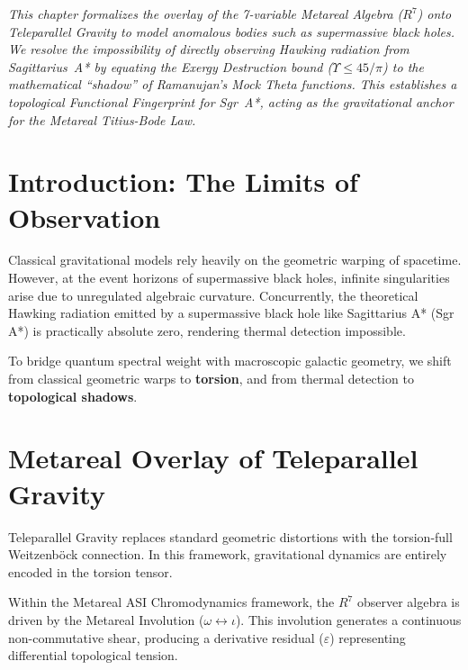 \noindent\textit{This chapter formalizes the overlay of the 7-variable Metareal Algebra ($R^7$) onto Teleparallel Gravity to model anomalous bodies such as supermassive black holes. We resolve the impossibility of directly observing Hawking radiation from Sagittarius~A* by equating the Exergy Destruction bound ($\Upsilon \leq 45/\pi$) to the mathematical ``shadow'' of Ramanujan's Mock Theta functions. This establishes a topological Functional Fingerprint for Sgr~A*, acting as the gravitational anchor for the Metareal Titius-Bode Law.}
\bigskip

\section{Introduction: The Limits of Observation}
Classical gravitational models rely heavily on the geometric warping of spacetime. However, at the event horizons of supermassive black holes, infinite singularities arise due to unregulated algebraic curvature. Concurrently, the theoretical Hawking radiation emitted by a supermassive black hole like Sagittarius A* (Sgr A*) is practically absolute zero, rendering thermal detection impossible.

To bridge quantum spectral weight with macroscopic galactic geometry, we shift from classical geometric warps to \textbf{torsion}, and from thermal detection to \textbf{topological shadows}.

\section{Metareal Overlay of Teleparallel Gravity}
Teleparallel Gravity replaces standard geometric distortions with the torsion-full Weitzenb\"ock connection. In this framework, gravitational dynamics are entirely encoded in the torsion tensor.

Within the Metareal ASI Chromodynamics framework, the $R^7$ observer algebra is driven by the Metareal Involution ($\omega \leftrightarrow \iota$). This involution generates a continuous non-commutative shear, producing a derivative residual ($\varepsilon$) representing differential topological tension.

